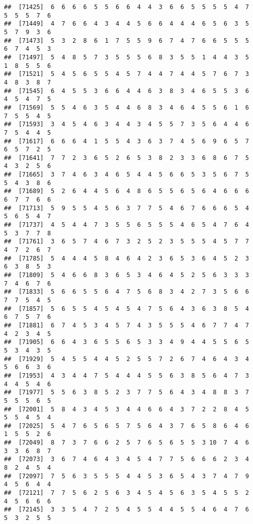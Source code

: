 \documentclass[
]{book}
\begin{document}
\begin{verbatim}
##  [71425]  6  6  6  6  5  5  6  6  4  4  3  6  6  5  5  5  5  4  7  5  5  5  7  6
##  [71449]  4  7  6  6  4  3  4  4  5  6  6  4  4  4  6  5  6  3  5  5  7  9  3  6
##  [71473]  5  3  2  8  6  1  7  5  5  9  6  7  4  7  6  6  5  5  5  6  7  4  5  3
##  [71497]  5  4  8  5  7  3  5  5  5  6  8  3  5  5  1  4  4  3  5  1  8  5  5  6
##  [71521]  5  4  5  6  5  5  4  5  7  4  4  7  4  4  5  7  6  7  3  4  8  3  8  7
##  [71545]  6  4  5  5  3  6  6  4  4  6  3  8  3  4  6  5  5  3  6  4  5  4  7  5
##  [71569]  5  5  4  6  3  5  4  4  6  8  3  4  6  4  5  5  6  1  6  7  5  5  4  5
##  [71593]  3  4  5  4  6  3  4  4  3  4  5  5  7  3  5  6  4  4  6  7  5  4  4  5
##  [71617]  6  6  6  4  1  5  5  4  3  6  3  7  4  5  6  9  6  5  7  6  5  7  2  5
##  [71641]  7  7  2  3  6  5  2  6  5  3  8  2  3  3  6  8  6  7  5  4  3  2  5  6
##  [71665]  3  7  4  6  3  4  6  5  4  4  5  6  6  5  3  5  6  7  5  5  4  3  8  6
##  [71689]  5  2  6  4  4  5  6  4  8  6  5  5  6  5  6  4  6  6  6  6  7  7  6  6
##  [71713]  5  9  5  5  4  5  6  3  7  7  5  4  6  7  6  6  6  5  4  5  6  5  4  7
##  [71737]  4  5  4  4  7  3  5  5  6  5  5  5  4  6  5  4  7  6  4  5  3  7  7  8
##  [71761]  3  6  5  7  4  6  7  3  2  5  2  3  5  5  5  4  5  7  7  4  7  2  6  7
##  [71785]  5  4  4  4  5  8  4  6  4  2  3  6  5  3  6  4  5  2  3  6  3  8  5  3
##  [71809]  5  4  6  6  8  3  6  5  3  4  6  4  5  2  5  6  3  3  3  7  4  6  7  6
##  [71833]  5  6  6  5  5  6  4  7  5  6  8  3  4  2  7  3  5  6  6  7  7  5  4  5
##  [71857]  5  6  5  5  4  5  4  5  4  7  5  6  4  3  6  3  8  5  4  6  7  5  7  6
##  [71881]  6  7  4  5  3  4  5  7  4  3  5  5  5  4  6  7  7  4  7  4  2  3  4  5
##  [71905]  6  6  4  3  6  5  5  6  5  3  3  4  9  4  4  5  5  6  5  5  3  4  3  5
##  [71929]  5  4  5  5  4  4  5  2  5  5  7  2  6  7  4  6  4  3  4  5  6  6  3  6
##  [71953]  4  3  4  4  7  5  4  4  4  5  5  6  3  8  5  6  4  7  3  4  4  5  4  6
##  [71977]  5  5  6  3  8  5  2  3  7  7  5  6  4  3  4  8  8  3  7  5  5  5  6  5
##  [72001]  5  8  4  3  4  5  3  4  4  6  6  4  3  7  2  2  8  4  5  5  5  4  5  4
##  [72025]  5  4  7  6  5  6  5  7  5  6  4  3  7  6  5  8  6  4  6  1  5  5  2  6
##  [72049]  8  7  3  7  6  6  2  5  7  6  5  6  5  5  3 10  7  4  6  3  3  6  8  7
##  [72073]  3  6  7  4  6  4  3  4  5  4  7  7  5  6  6  6  2  3  4  8  2  4  5  4
##  [72097]  7  5  6  3  5  5  5  4  4  5  3  6  5  4  3  7  4  7  9  4  5  6  4  4
##  [72121]  7  7  5  6  2  5  6  3  4  5  4  5  6  3  5  4  5  5  2  4  5  6  6  6
##  [72145]  3  3  5  4  7  2  5  4  5  5  4  4  5  5  4  6  4  7  6  5  3  2  5  5

\end{verbatim}
\end{document}
